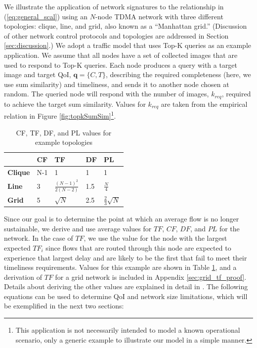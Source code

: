 We illustrate the application of network signatures to the relationship in (\ref{eq:general_scal}) using an $N$-node TDMA network with three different topologies: clique, line, and grid, also known as a ``Manhattan grid.'' (Discussion of other network control protocols and topologies are addressed in Section \ref{sec:discussion}.)  We adopt a traffic model that uses Top-K queries as an example application.  We assume that all nodes have a set of collected images that are used to respond to Top-K queries.  Each node produces a query with a target image and target QoI, $\mathbf{q} = \{C, T\}$, describing the required completeness (here, we use sum similarity) and timeliness, and sends it to another node chosen at random.  The queried node will respond with the number of images, $k_{req}$, required to achieve the target sum similarity.  Values for $k_{req}$ are taken from the empirical relation in Figure \ref{fig:topkSumSim}\footnote{This application is not necessarily intended to model a known operational scenario, only a generic example to illustrate our model in a simple manner.}.  

\begin{table}[h]
\centering
\begin{tabular}{l|l|l|l|l|}
\cline{2-5}
                            					 & \textbf{CF}  					& \textbf{TF}   				& \textbf{DF}	& \textbf{PL} 			\\ \hline
\multicolumn{1}{|l|}{\textbf{Clique}} 	& N-1 							& 1                              		& 1  			& 1 					\\ \hline
\multicolumn{1}{|l|}{\textbf{Line}}   	& 3   							& $\frac{(N-1)^2}{2(N-2)}$ 	& 1.5 			& $\frac{N}{4}$			\\ \hline
\multicolumn{1}{|l|}{\textbf{Grid}}   	& 5   							& $\sqrt{N}$                       	&  2.5			& $\frac{2}{3} \sqrt{N}$   \\ \hline
\end{tabular}
\caption{CF, TF, DF, and PL values for example topologies}
\label{table:rf_ff_sf_values}
\vspace{-5mm}
\end{table}

Since our goal is to determine the point at which an average flow is no longer sustainable, we derive and use average values for $TF$, $CF$, $DF$, and $PL$ for the network.  In the case of $TF$, we use the value for the node with the largest expected $TF_i$ since flows that are routed through this node are expected to experience that largest delay and are likely to be the first that fail to meet their timeliness requirements.  Values for this example are shown in Table \ref{table:rf_ff_sf_values}, and a derivation of $TF$ for a grid network is included in Appendix \ref{sec:grid_tf_proof}.  Details about deriving the other values are explained in detail in \cite{symptotics_tech_report}.  The following equations can be used to determine QoI and network size limitations, which will be exemplified in the next two sections:

